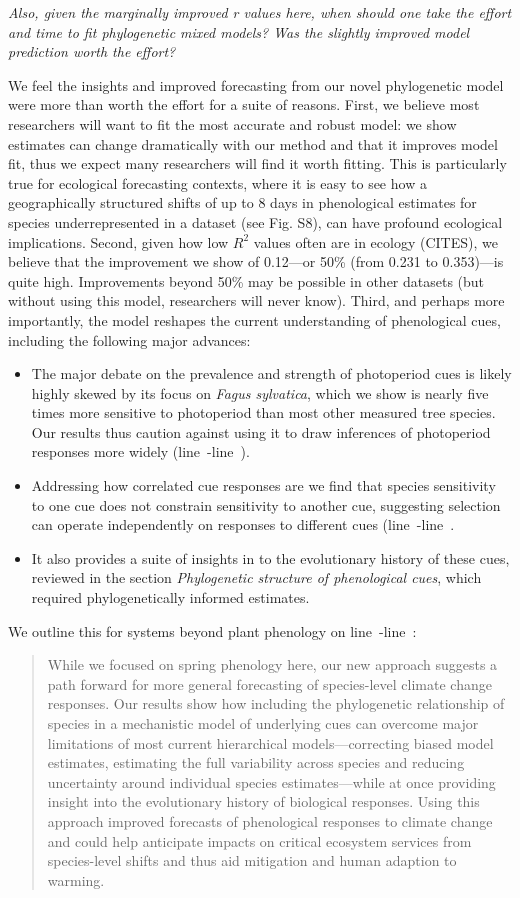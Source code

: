 \documentclass[11pt]{article}
\newcommand{\lr}[1]{line~\lineref{#1}}
\begin{document}
\emph{Also, given the marginally improved r values here, when should one take the effort and time to fit phylogenetic mixed models? Was the slightly improved model prediction worth the effort?}

We feel the insights and improved forecasting from our novel phylogenetic model were more than worth the effort for a suite of reasons. First, we believe most researchers will want to fit the most accurate and robust model: we show estimates can change dramatically with our method and that it improves model fit, thus we expect many researchers will find it worth fitting. This is particularly true for ecological forecasting contexts, where it is easy to see how a geographically structured shifts of up to 8 days in phenological estimates for species underrepresented in a dataset (see Fig. S8), can have profound ecological implications. Second, given how low $R^2$ values often are in ecology (CITES), we believe that the improvement we show of 0.12---or 50\% (from 0.231 to 0.353)---is quite high. Improvements beyond 50\% may be possible in other datasets (but without using this model, researchers will never know). Third, and perhaps more importantly, the model reshapes the current understanding of phenological cues, including the following major advances:
\begin{itemize}
\item The major debate on the prevalence and strength of photoperiod cues is likely highly skewed by its focus on \emph{Fagus sylvatica}, which we show is nearly five times more sensitive to photoperiod than most other measured tree species. Our results thus caution against using it to draw inferences of photoperiod responses more widely (\lr{whyuse2}-\lr{whyuse2E}). 
\item Addressing how correlated cue responses are we find that species sensitivity to one cue does not constrain sensitivity to another cue, suggesting selection can operate independently on responses to different cues (\lr{whyuse1}-\lr{whyuse1E}.
\item It also provides a suite of insights in to the evolutionary history of these cues, reviewed in the section \emph{Phylogenetic structure of phenological cues}, which required phylogenetically informed estimates. 
\end{itemize} 
We outline this for systems beyond plant phenology on \lr{whyuse3}-\lr{whyuse3E}:
\begin{quote}
While we focused on spring phenology here, our new approach suggests a path forward for more general forecasting of species-level climate change responses. Our results show how including the phylogenetic relationship of species in a mechanistic model of underlying cues can overcome major limitations of most current hierarchical models---correcting biased model estimates, estimating the full variability across species and reducing uncertainty around individual species estimates---while at once providing insight into the evolutionary history of biological responses. Using this approach improved forecasts of phenological responses to climate change and could help anticipate impacts on critical ecosystem services from species-level shifts and thus aid mitigation and human adaption to warming. 
\end{quote}
\end{document}

